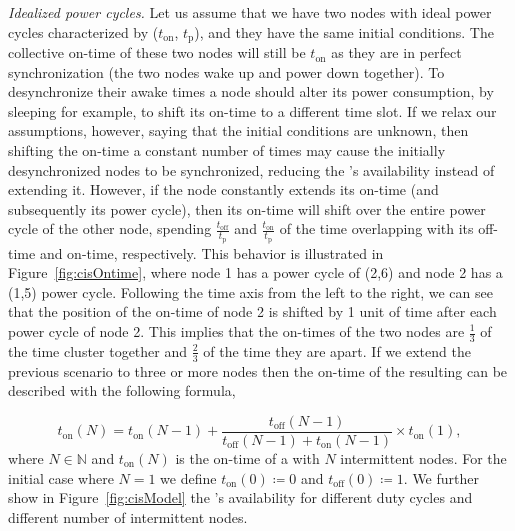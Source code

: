 \noindent\textit{Idealized power cycles.}
Let us assume that we have two nodes with ideal power cycles characterized by ($t_\text{on}$, $t_\text{p}$), and they have the same initial conditions. The collective on-time of these two nodes will still be $t_\text{on}$ as they are in perfect synchronization (the two nodes wake up and power down together). 
% 
To desynchronize their awake times a node should alter its power consumption, by sleeping for example, to shift its on-time to a different time slot. 
If we relax our assumptions, however, saying that the initial conditions are unknown, then shifting the on-time a constant number of times may cause the initially desynchronized nodes to be synchronized, reducing the \sys's availability instead of extending it.  However, if the node constantly extends its on-time (and subsequently its power cycle), then its on-time will shift over the entire power cycle of the other node, spending 
$\frac{ t_\text{off} }{t_\text{p}}$ and $\frac{ t_\text{on} }{t_\text{p}}$ of the time overlapping with its off-time and on-time, respectively. 
 This behavior is illustrated in Figure~\ref{fig:cisOntime}, where node 1 has a power cycle of (2,6) and node 2 has a (1,5) power cycle.
Following the time axis from the left to the right, we can see that the position of the on-time of node 2 is shifted by 1 unit of time after each power cycle of node 2. This implies that the on-times of the two nodes are $\frac{1}{3}$ of the time cluster together and $\frac{2}{3}$ of the time they are apart. If we extend the previous scenario to three or more nodes then the on-time of the resulting \sys can be described with the following formula,
				
\begin{equation}
	t_\text{on}(N) = t_\text{on}(N-1) + \frac{t_\text{off}(N-1)}{t_\text{off}(N-1)+t_\text{on}(N-1)} \times t_\text{on}(1),
		\label{eq:cisModel}
\end{equation}
where $N \in \mathbb{N}$ and  $t_\text{on}(N)$ is the on-time of a \sys with $N$ intermittent nodes. For the initial case where $N=1$ we define $t_\text{on}(0)\coloneqq 0$ and $t_\text{off}(0) \coloneqq 1$. We further show in Figure~\ref{fig:cisModel} the \sys's availability for different duty cycles and different number of intermittent nodes.
%
%
%
%

